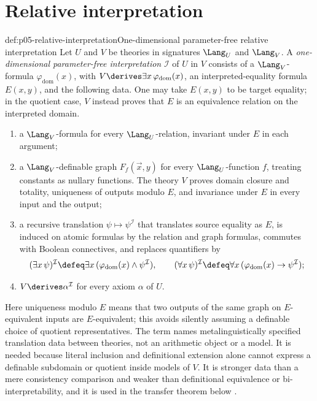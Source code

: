 \section{Relative interpretation}

\begin{hbdefinition}{def:p05-relative-interpretation}{One-dimensional parameter-free relative interpretation}
Let \(U\) and \(V\) be theories in signatures \(\Lang_U\) and
\(\Lang_V\).  A \emph{one-dimensional parameter-free interpretation}
\(\mathcal I\) of \(U\) in \(V\) consists of a \(\Lang_V\)-formula
\(\varphi_{\mathrm{dom}}(x)\), with
\(V\derives\exists x\,\varphi_{\mathrm{dom}}(x)\), an interpreted-equality
formula \(E(x,y)\), and the following data.  One may take \(E(x,y)\) to be
target equality; in the quotient case, \(V\) instead proves that \(E\) is
an equivalence relation on the interpreted domain.
\begin{enumerate}
  \item a \(\Lang_V\)-formula for every \(\Lang_U\)-relation, invariant
        under \(E\) in each argument;
  \item a \(\Lang_V\)-definable graph \(F_f(\vec x,y)\) for every
        \(\Lang_U\)-function \(f\), treating constants as nullary
        functions.  The theory \(V\) proves domain closure and totality,
        uniqueness of outputs modulo \(E\), and invariance under \(E\) in
        every input and the output;
  \item a recursive translation \(\psi\mapsto\psi^{\mathcal I}\) that
        translates source equality as \(E\), is induced on atomic formulas
        by the relation and graph formulas, commutes with Boolean
        connectives, and replaces quantifiers by
        \[
          (\exists x\,\psi)^{\mathcal I}\defeq
          \exists x\,(\varphi_{\mathrm{dom}}(x)\land\psi^{\mathcal I}),
          \qquad
          (\forall x\,\psi)^{\mathcal I}\defeq
          \forall x\,(\varphi_{\mathrm{dom}}(x)\to\psi^{\mathcal I});
        \]
  \item \(V\derives\alpha^{\mathcal I}\) for every axiom
        \(\alpha\) of \(U\).
\end{enumerate}
Here uniqueness modulo \(E\) means that two outputs of the same graph on
\(E\)-equivalent inputs are \(E\)-equivalent; this avoids silently assuming
a definable choice of quotient representatives.  The term names
metalinguistically specified translation data between theories, not an
arithmetic object or a model.  It is needed because literal inclusion and
definitional extension alone cannot express a definable subdomain or
quotient inside models of \(V\).  It is stronger data than a mere
consistency comparison and weaker than definitional equivalence or
bi-interpretability, and it is used in the transfer theorem below
\cite{TMR1953,Lindstrom2003}.
\end{hbdefinition}

